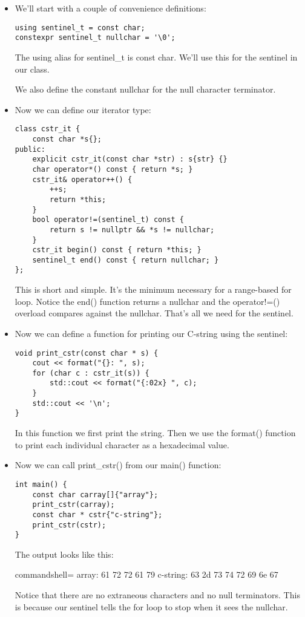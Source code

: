 \begin{itemize}
\item 
We'll start with a couple of convenience definitions:

\begin{lstlisting}[style=styleCXX]
using sentinel_t = const char;
constexpr sentinel_t nullchar = '\0';
\end{lstlisting}

The using alias for sentinel\_t is const char. We'll use this for the sentinel in our class.

We also define the constant nullchar for the null character terminator.

\item 
Now we can define our iterator type:

\begin{lstlisting}[style=styleCXX]
class cstr_it {
	const char *s{};
public:
	explicit cstr_it(const char *str) : s{str} {}
	char operator*() const { return *s; }
	cstr_it& operator++() {
		++s;
		return *this;
	}
	bool operator!=(sentinel_t) const {
		return s != nullptr && *s != nullchar;
	}
	cstr_it begin() const { return *this; }
	sentinel_t end() const { return nullchar; }
};
\end{lstlisting}

This is short and simple. It's the minimum necessary for a range-based for loop. Notice the end() function returns a nullchar and the operator!=() overload compares against the nullchar. That's all we need for the sentinel.

\item 
Now we can define a function for printing our C-string using the sentinel:

\begin{lstlisting}[style=styleCXX]
void print_cstr(const char * s) {
	cout << format("{}: ", s);
	for (char c : cstr_it(s)) {
		std::cout << format("{:02x} ", c);
	}
	std::cout << '\n';
}
\end{lstlisting}

In this function we first print the string. Then we use the format() function to print each individual character as a hexadecimal value.

\item 
Now we can call print\_cstr() from our main() function:

\begin{lstlisting}[style=styleCXX]
int main() {
	const char carray[]{"array"};
	print_cstr(carray);
	const char * cstr{"c-string"};
	print_cstr(cstr);
}
\end{lstlisting}

The output looks like this:

\begin{tcblisting}{commandshell={}}
array: 61 72 72 61 79
c-string: 63 2d 73 74 72 69 6e 67
\end{tcblisting}

Notice that there are no extraneous characters and no null terminators. This is because our sentinel tells the for loop to stop when it sees the nullchar.

\end{itemize}

